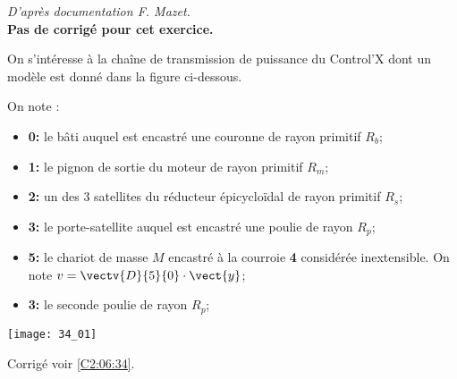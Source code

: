 \normaltrue \difficilefalse \tdifficilefalse
\correctionfalse
\renewcommand{\UPSTIidClasse}{12}

\textit{D'après documentation F. Mazet.} \\
\setcounter{question}{0}
\ifcorrection
\else
\textbf{Pas de corrigé pour cet exercice.}
\fi

\ifprof
\else
On s'intéresse à la chaîne de transmission de puissance du Control'X dont un modèle est donné dans la figure ci-dessous.

On note : 
\begin{itemize}
\item \textbf{0:} le bâti auquel est encastré une couronne de rayon primitif $R_b$;
\item \textbf{1:} le pignon de sortie du moteur de rayon primitif $R_m$;
\item \textbf{2:} un des 3 satellites du réducteur épicycloïdal de rayon primitif $R_s$;
\item \textbf{3:} le porte-satellite auquel est encastré une poulie de rayon $R_p$;
\item \textbf{5:} le chariot de masse $M$ encastré à la courroie \textbf{4} considérée inextensible. On note $v=\vectv{D}{5}{0}\cdot \vect{y}$;
\item \textbf{3:} le seconde poulie de rayon $R_p$;
\end{itemize}


\begin{center}
\texttt{[image: 34\_01]}
\end{center}
\fi


\ifprof
\else
\fi



\ifprof
\else
\begin{flushright}
\footnotesize{Corrigé  voir \ref{C2:06:34}.}
\end{flushright}%
\fi
